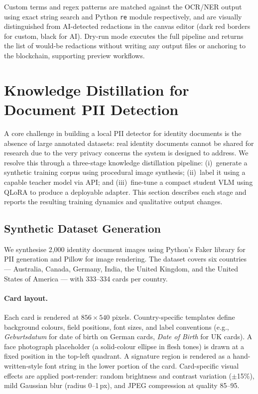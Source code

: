 \documentclass[conference]{IEEEtran}
\begin{document}
Custom terms and regex patterns are matched against
the OCR/NER output using exact string search and
Python \texttt{re} module respectively,
and are visually distinguished from AI-detected
redactions in the canvas editor (dark red borders
for custom, black for AI).
Dry-run mode executes the full pipeline and returns
the list of would-be redactions without writing any
output files or anchoring to the blockchain,
supporting preview workflows.

\section{Knowledge Distillation for Document PII Detection}
\label{sec:knowledge_distillation}

A core challenge in building a local PII detector for
identity documents is the absence of large annotated
datasets: real identity documents cannot be shared for
research due to the very privacy concerns the system
is designed to address.
We resolve this through a three-stage knowledge
distillation pipeline:
(i)~generate a synthetic training corpus using
procedural image synthesis;
(ii)~label it using a capable teacher model via API;
and (iii)~fine-tune a compact student VLM using
QLoRA to produce a deployable adapter.
This section describes each stage and reports the
resulting training dynamics and qualitative output
changes.

\subsection{Synthetic Dataset Generation}

We synthesise 2,000 identity document images using
Python's Faker library for PII generation and Pillow
for image rendering.
The dataset covers six countries --- Australia,
Canada, Germany, India, the United Kingdom, and the
United States of America --- with 333--334 cards per
country.

\paragraph{Card layout.}
Each card is rendered at $856 \times 540$ pixels.
Country-specific templates define background colours,
field positions, font sizes, and label conventions
(e.g., \textit{Geburtsdatum} for date of birth on
German cards, \textit{Date of Birth} for UK cards).
A face photograph placeholder (a solid-colour ellipse
in flesh tones) is drawn at a fixed position in the
top-left quadrant.
A signature region is rendered as a hand-written-style
font string in the lower portion of the card.
Card-specific visual effects are applied post-render:
random brightness and contrast variation
($\pm$15\%), mild Gaussian blur (radius 0--1\,px),
and JPEG compression at quality 85--95.
\end{document}
